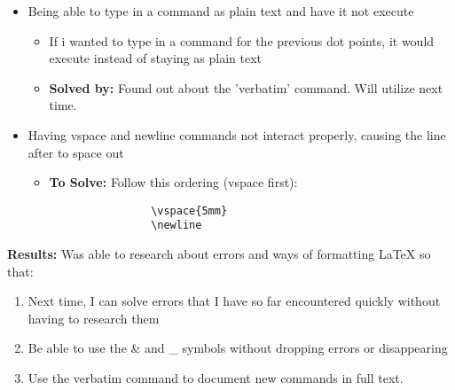 \documentclass{article}
\begin{document}
\begin{itemize}
\begin{itemize}
        \item \textbf{Solved by:} checking where I have incorrectly used a double backslash or newline. Error went away
    \end{itemize}
    \item Being able to type in a command as plain text and have it not execute
        \begin{itemize}
            \item If i wanted to type in a command for the previous dot points, it would execute instead of staying as plain text
            \item \textbf{Solved by:} Found out about the 'verbatim' command. Will utilize next time.
        \end{itemize}
    \item Having vspace and newline commands not interact properly, causing the line after to space out
        \begin{itemize}
            \item \textbf{To Solve:} Follow this ordering (vspace first):
            \begin{verbatim}
                \vspace{5mm}
                \newline
            \end{verbatim}
        \end{itemize}
\end{itemize}
\textbf{Results:} Was able to research about errors and ways of formatting LaTeX so that:
\begin{enumerate}
    \item Next time, I can solve errors that I have so far encountered quickly without having to research them
    \item Be able to use the \& and \_ symbols without dropping errors or disappearing
    \item Use the verbatim command to document new commands in full text.
\end{enumerate}
\end{document}

